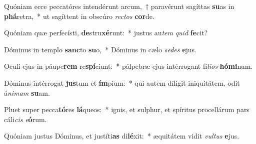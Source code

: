 \item Quóniam ecce peccatóres intendérunt arcum,~† paravérunt sagíttas \textbf{su}as in \textbf{phá}retra,~* ut sagíttent in obscúro \textit{rec}\textit{tos} \textbf{cor}de.
\item Quóniam quæ perfecísti, \textbf{de}stru\textbf{xé}runt:~* justus au\textit{tem} \textit{quid} \textbf{fe}cit?
\item Dóminus in templo \textbf{sanc}to \textbf{su}o,~* Dóminus in cælo \textit{se}\textit{des} \textbf{e}jus.
\item Oculi ejus in páupe\textbf{rem} re\textbf{spí}ciunt:~* pálpebræ ejus intérrogant fí\textit{li}\textit{os} \textbf{hó}\textbf{mi}num.
\item Dóminus intérrogat \textbf{jus}tum et \textbf{ím}pium:~* qui autem díligit iniquitátem, odit á\textit{ni}\textit{mam} \textbf{su}am.
\item Pluet super pecca\textbf{tó}res \textbf{lá}queos:~* ignis, et sulphur, et spíritus procellárum pars cáli\textit{cis} \textit{e}\textbf{ó}rum.
\item Quóniam justus Dóminus, et justíti\textbf{as} di\textbf{lé}xit:~* æquitátem vidit \textit{vul}\textit{tus} \textbf{e}jus.
